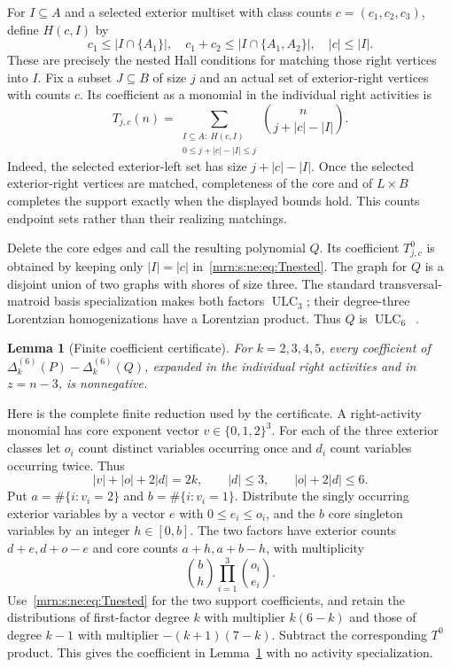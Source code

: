 \documentclass[11pt,a4paper]{article}
\newtheorem{lemma}[theorem]{Lemma}
\theoremstyle{remark}\newtheorem{remark}[theorem]{Remark}
\newcommand{\ULC}{\operatorname{ULC}}      %
\newcommand{\gap}{\Delta}                  %
\begin{document}
For $I\subseteq A$ and a selected exterior multiset with class counts $c=(c_1,c_2,c_3)$, define $H(c,I)$ by
\begin{equation}\label{mrn:s:ne:eq:hall}
 c_1\le |I\cap\{A_1\}|,\quad
 c_1+c_2\le |I\cap\{A_1,A_2\}|,\quad
 |c|\le |I|.
\end{equation}
These are precisely the nested Hall conditions for matching those right vertices into $I$. Fix a subset $J\subseteq B$ of size $j$ and an actual set of exterior-right vertices with counts $c$. Its coefficient as a monomial in the individual right activities is
\begin{equation}\label{mrn:s:ne:eq:Tnested}
 T_{j,c}(n)=\sum_{\substack{I\subseteq A:\ H(c,I)\\0\le j+|c|-|I|\le j}}
 \binom n{j+|c|-|I|}.
\end{equation}
Indeed, the selected exterior-left set has size $j+|c|-|I|$. Once the selected exterior-right vertices are matched, completeness of the core and of $L\times B$ completes the support exactly when the displayed bounds hold. This counts endpoint sets rather than their realizing matchings.

Delete the core edges and call the resulting polynomial $Q$. Its coefficient $T^0_{j,c}$ is obtained by keeping only $|I|=|c|$ in~\eqref{mrn:s:ne:eq:Tnested}. The graph for $Q$ is a disjoint union of two graphs with shores of size three. The standard transversal-matroid basis specialization makes both factors $\ULC_3$; their degree-three Lorentzian homogenizations have a Lorentzian product. Thus $Q$ is $\ULC_6$~\cite{b:BH,b:m74}.

\begin{lemma}[Finite coefficient certificate]\label{mrn:s:ne:lem:cert}
For $k=2,3,4,5$, every coefficient of $\gap_k^{(6)}(P)-\gap_k^{(6)}(Q)$, expanded in the individual right activities and in $z=n-3$, is nonnegative.
\end{lemma}
Here is the complete finite reduction used by the certificate. A right-activity monomial has core exponent vector $v\in\{0,1,2\}^3$. For each of the three exterior classes let $o_i$ count distinct variables occurring once and $d_i$ count variables occurring twice. Thus
\[
 |v|+|o|+2|d|=2k,\qquad |d|\le3,\qquad |o|+2|d|\le6.
\]
Put $a=\#\{i:v_i=2\}$ and $b=\#\{i:v_i=1\}$. Distribute the singly occurring exterior variables by a vector $e$ with $0\le e_i\le o_i$, and the $b$ core singleton variables by an integer $h\in[0,b]$. The two factors have exterior counts $d+e,d+o-e$ and core counts $a+h,a+b-h$, with multiplicity
\[
 \binom bh\prod_{i=1}^3\binom{o_i}{e_i}.
\]
Use~\eqref{mrn:s:ne:eq:Tnested} for the two support coefficients, and retain the distributions of first-factor degree $k$ with multiplier $k(6-k)$ and those of degree $k-1$ with multiplier $-(k+1)(7-k)$. Subtract the corresponding $T^0$ product. This gives the coefficient in Lemma~\ref{mrn:s:ne:lem:cert} with no activity specialization.
\end{document}
